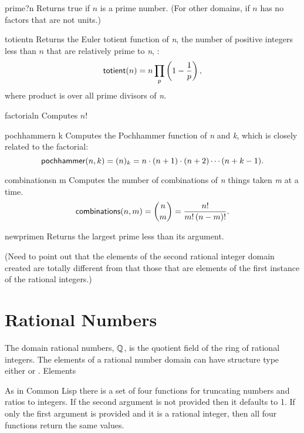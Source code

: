 \begin{functiondef}{prime?}{n}
Returns true if $n$ is a prime number. (For other domains,
if $n$ has no factors that are not units.)
\end{functiondef}  

\begin{functiondef}{totient}{n}
Returns the Euler totient function of {\em n}, the number of positive
integers less than $n$ that are relatively prime to {\em n}, \ie:
\[
\mbox{\sf totient}(n) = n \prod_p \left(1 - \frac{1}{p}\right),
\]
where product is over all prime divisors of {\em n}.
\end{functiondef}

\begin{functiondef}{factorial}{n}
Computes $n!$
\end{functiondef}
  
\begin{functiondef}{pochhammer}{n k}
Computes the Pochhammer function of {\em n} and {\em k}, which is
closely related to the factorial:
\[
\mbox{\sf pochhammer}(n, k) = (n)_k = n \cdot (n+1) \cdot (n+2) \cdots
(n+k-1).
\]
\end{functiondef}


\begin{functiondef}{combinations}{n m}
Computes the number of combinations of {\em n} things taken {\em m} at
a time. 
\[
\mbox{\sf combinations}(n, m) = {n \choose m} = \frac{n!}{m! \,
(n-m)!}.
\]
\end{functiondef}
  
\begin{functiondef}{newprime}{n}
Returns the largest prime less than its argument.
\end{functiondef}

(Need to point out that the elements of the second rational integer
domain created are totally different from that those that are elements
of the first instance of the rational integers.)

\section{Rational Numbers}
\label{Rational:Numbers:Sec}

The domain rational numbers, ${\Bbb Q}$, is the quotient field of the ring
of rational integers.  The elements of a rational number domain can
have structure type either  or
.  Elements

As in Common Lisp there is a set of four functions for truncating
numbers and ratios to integers.  If the second argument is not
provided then it defaults to 1.  If only the first argument is
provided and it is a rational integer, then all four functions return
the same values.

